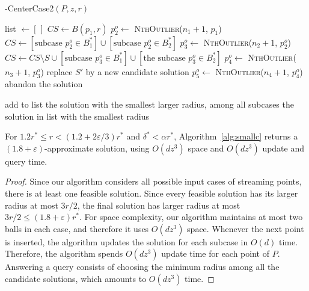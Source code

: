 \documentclass[envcountsame]{cls/cccg15}
\renewcommand{\O}{\ensuremath{{O}}}
\newcommand{\Call}[2]{\textsc{#1}(#2)}
\newcommand{\lee}{\leqslant}
\renewcommand{\le}{\lee}
\newcommand{\eps}{\varepsilon}
\begin{document}
\begin{algorithm}
\caption{-CenterCase2$(P, z, r)$} 
\label{alg:smallc}
\begin{algorithmic}[1]
 	\STATE list $\gets [\,]$
		\STATE $CS \gets B(p_1,r)$
		\STATE $p^o_{2} \gets $ \Call{NthOutlier}{$n_1 + 1$, $p_1$}
			\STATE $CS\gets [ \text{subcase $p^o_{2} \in B_1^*$} ] \cup [ \text{subcase $p^o_{2} \in B_2^*$} ]$
				\STATE $p^o_{3} \gets$ \Call{NthOutlier}{$n_2 + 1$, $p^o_{2}$}
					\STATE $CS\gets CS\setminus S \cup [ \text{subcase $p^o_{3} \in B_1^*$} ] \cup [ \text{the subcase $p^o_{3} \in B_2^*$}]$
						\STATE $p^o_{4} \gets$ \Call{NthOutlier}{$n_3 + 1$, $p^o_{3}$}
							\STATE replace $S'$ by a new candidate solution
							\STATE $p^o_{5} \gets$ \Call{NthOutlier}{$n_4 + 1$, $p^o_{4}$}
								\STATE abandon the solution
							\ENDIF
						\ENDIF
					\ENDFOR
				\ENDIF
			\ENDFOR

		\ENDIF
		\STATE add to list the solution with the smallest larger radius, among all subcases
	\ENDFOR
	\RETURN the solution in list with the smallest radius
\end{algorithmic}
\end{algorithm}



\begin{theorem}
	For $1.2r^* \le r < (1.2 + 2\eps/3)r^*$ and $\delta^* < \alpha r^*$,
	Algorithm~\ref{alg:smallc} returns a $(1.8+\eps)$-approximate solution,
	using $\O (dz^3)$ space and $\O (dz^3)$ update and query time.
\end{theorem}

\begin{proof}
Since our algorithm considers all possible input cases of streaming points, there is at least one feasible solution. Since every feasible solution has its larger radius at most $3r/2$, the final solution has larger radius at most $3r/2 \le (1.8 + \eps)r^*$.
For space complexity, our algorithm maintains at most two balls in each case, and therefore it uses $\O(dz^3)$ space. Whenever the next point is inserted, the algorithm updates the solution for each subcase in $\O (d)$ time. Therefore, the algorithm spends $\O (dz^3)$ update time for each point of $P$. Answering a query consists of choosing the minimum radius among all the candidate solutions, which amounts to $\O (dz^3)$ time.
\end{proof}
\end{document}
